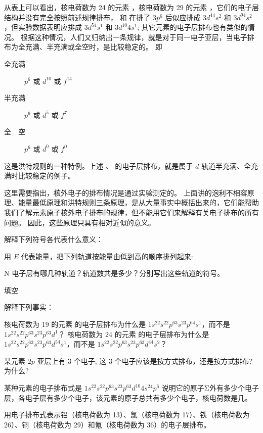 从表上可以看出，核电荷数为 24 的元素 ，核电荷数为 29 的元素 ，它们的电子层结构并没有完全按照前述规律排布， 和  在排了 $3p^6$ 后似应排成 $3d^44s^2$ 和 $3d^94s^2$，但实验数据表明应排成 $3d^54s^1$ 和 $3d^{10}4s^1$; 其它元素的电子层排布也有类似的情况。
根据这种情况，人们又归纳出一条规律，就是对于同一电子亚层，当电子排布为全充满、半充满或全空时，是比较稳定的。
即
\begin{description}
  \item[全充满] $p^6$ 或 $d^{10}$ 或 $f^{14}$ 
  \item[半充满] $p^6$ 或 $d^5$ 或 $f^7$ 
  \item[全　空] $p^6$ 或 $d^0$ 或 $f^0$ 
\end{description}
这是洪特规则的一种特例。上述 、 的电子层排布，就是属于 $d$ 轨道半充满、全充满时比较稳定的例子。

这里需要指出，核外电子的排布情况是通过实验测定的。
上面讲的泡利不相容原理、能量最低原理和洪特规则三条原理，是从大量事实中概括出来的，它们能帮助我们了解元素原子核外电子排布的规律，但不能用它们来解释有关电子排布的所有问题。
因此，这些原理只具有相对近似的意义。

\begin{Practice}[习题]
  \begin{question}
    \item 解释下列符号各代表什么意义：
    \item 用 $E$ 代表能量，把下列轨道按能量由低到高的顺序排列起来:
    \item N 电子层有哪几种轨道？轨道数共是多少？分别写出这些轨道的符号。
    \item 填空
    \item 解释下列事实：
    \begin{tasks}
      \task 核电荷数为 19 的元素  的电子层排布为什么是 $1s^22s^22p^63s^23p^64s^1$，而不是 $1s^22s^22p^63s^23p^63d^1$？
      \task 核电荷数为 24 的元素  的电子层排布为什么是 $1s^22s^22p^63s^23p^63d^54s^1$，而不是 $1s^22s^22p^63s^23p^63d^44s^2$？
    \end{tasks}
    \item 某元素 $2p$ 亚层上有 3 个电子; 这 3 个电子应该是按方式排布，还是按方式排布? 为什么?
    \item 某种元素的电子排布式是 $1s^22s^22p^63s^23p^63d^{10}4s^24p^6$ 说明它的原子Σ外有多少个电子层，各电子层有多少个电子，该元素的原子总共有多少个电子，核电荷数是几。
    \item 用电子排布式表示铝（核电荷数为 13）、氯（核电荷数为 17）、铁（核电荷数为 26）、铜（核电荷数为 29）和氪（核电荷数为 36）的电子层排布。
  \end{question}
\end{Practice}

